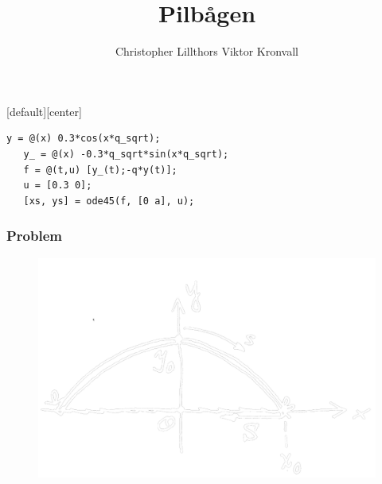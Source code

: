 \documentclass[xcolor=dvipsnames]{beamer}
\author{Christopher Lillthors Viktor Kronvall}
\title{Pilbågen}
\begin{document}
\maketitle
{}[default][center]

\begin{lrbox}{\firstexample}
\begin{lstlisting}[caption=Föreklat system]
   y = @(x) 0.3*cos(x*q_sqrt);
   y_ = @(x) -0.3*q_sqrt*sin(x*q_sqrt);
   f = @(t,u) [y_(t);-q*y(t)];
   u = [0.3 0];
   [xs, ys] = ode45(f, [0 a], u);
\end{lstlisting}
\end{lrbox}

\begin{lrbox}{\findroot}

\end{lrbox}
\begin{lrbox}{\original}

\end{lrbox}

\begin{frame}
\frametitle{Problem}
\begin{figure}[h!]
\centering
\includegraphics[scale=0.2]{bild.png}
\end{figure}
\end{frame}
\end{document}
